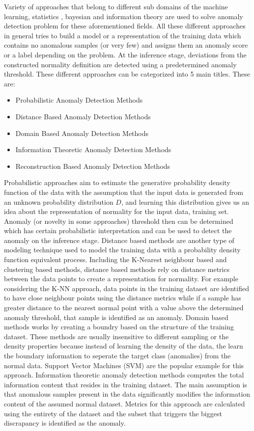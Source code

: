 Variety of approaches that belong to different sub domains of the machine learning, statistics ,
bayesian and information theory are used to solve anomaly detection problem for these aforementioned
fields. All these different approaches in general tries to build a model or a representation of the
training data which contains no anomalous samples (or very few) and assigns them an anomaly score or
a label depending on the problem. At the inference stage, deviations from the constructed normality
definition are detected using a predetermined anomaly threshold. These different approaches can be
categorized into 5 main titles. These are:

\begin{itemize}
  \item Probabilistic Anomaly Detection Methods
  \item Distance Based Anomaly Detection Methods
  \item Domain Based Anomaly Detection Methods
  \item Information Theoretic Anomaly Detection Methods
  \item Reconstruction Based Anomaly Detection Methods  
\end{itemize}

Probabilistic approaches aim to estimate the generative probability density function of the data
with the assumption that the input data is generated from an unknown probability distribution $D$,
and learning this distribution gives us an idea about the representation of normality for the input
data, training set. Anomaly (or novelty in some approaches) threshold then can be determined which has
certain probabilistic interpretation and can be used to detect the anomaly on the inference stage.
\cite{Pimentel:2014:RRN:2588908.2589196} Distance based methods are another type of modeling
technique used to model the training data with a probability density function equivalent process.
Including the K-Nearest neighbour based and clustering based methods, distance based methods rely on
distance metrics between the data points to create a representation for normality. For example
considering the K-NN approach, data points in the training dataset are identified to have close
neighbour points using the distance metrics while if a sample has greater distance to the
nearest normal point with a value above the determined anomaly threshold, that sample is identified
as an anomaly. Domain based methods works by creating a boundry based on the structure of the
training dataset. \cite{Pimentel:2014:RRN:2588908.2589196} These methods are usually insensitive to
different sampling or the density properties because instead of learning the density of
the data, the learn the boundary information to seperate the target class (anomalies) from the
normal data. Support Vector Machines (SVM) are the popular example for this approach. Information
theoretic anomaly detection methods computes the total information content that resides in the
training dataset. The main assumption is that anomalous samples present in the data significantly
modifies the information content of the assumed normal dataset. Metrics for this approach are
calculated using the entirety of the dataset and the subset that triggers the biggest discrapancy is
identified as the anomaly. 

